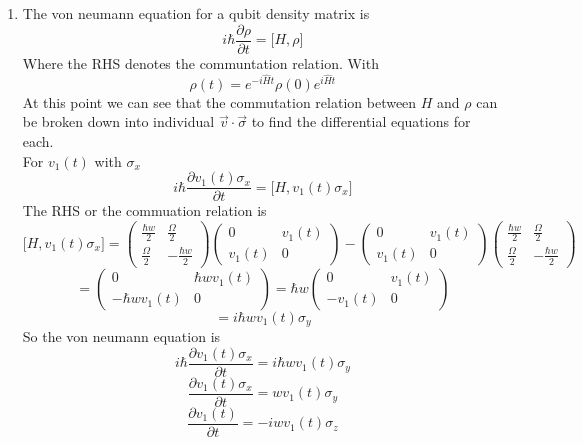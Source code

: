 \documentclass[12pt]{article}
\begin{document}
\begin{enumerate}
\begin{enumerate}
    \item The von neumann equation for a qubit density matrix is 
    $$ i \hbar \frac{\partial \rho}{\partial t} = \Big[ H, \rho \Big] $$
    Where the RHS denotes the communtation relation. With 
    $$ \rho (t) = e^{-i \hat{H} t} \rho (0) e^{i \hat{H} t} $$
    At this point we can see that the commutation relation between $H$ and $\rho$ can be broken down into individual $\vec{v} \cdot \vec{\sigma} $ to find the differential equations for each.
    \\
    For $v_1 (t)$ with $\sigma_x$ 
    $$ i \hbar \frac{\partial v_1 (t) \sigma_x}{\partial t} = \Big[H, v_1 (t) \sigma_x \Big] $$
    The RHS or the commuation relation is 
    $$ \Big[H, v_1 (t) \sigma_x \Big] = \left(\begin{array}{ccc} \frac{\hbar w}{2} & \frac{\Omega}{2} \\ \frac{\Omega}{2} & -\frac{\hbar w}{2} \end{array}\right) \left(\begin{array}{ccc} 0 & v_1 (t) \\ v_1 (t) & 0 \end{array}\right)  - \left(\begin{array}{ccc} 0 & v_1 (t) \\ v_1 (t) & 0 \end{array}\right) \left(\begin{array}{ccc} \frac{\hbar w}{2} & \frac{\Omega}{2} \\ \frac{\Omega}{2} & -\frac{\hbar w}{2} \end{array}\right) $$
    $$ =  \left(\begin{array}{ccc} 0 & \hbar w v_1 (t) \\ -\hbar w v_1 (t) & 0 \end{array}\right) = \hbar w  \left(\begin{array}{ccc} 0 & v_1 (t) \\ -v_1 (t) & 0 \end{array}\right) $$
    $$ = i \hbar w v_1 (t) \sigma_y $$ 
    So the von neumann equation is 
    $$ i \hbar \frac{\partial v_1 (t) \sigma_x}{\partial t} = i \hbar w v_1 (t) \sigma_y $$ 
    $$  \frac{\partial v_1 (t) \sigma_x}{\partial t} = wv_1 (t) \sigma_y $$ 
    $$ \frac{\partial v_1 (t)}{\partial t} = -i w v_1 (t) \sigma_z $$



\end{enumerate}
\end{enumerate}
\end{document}
